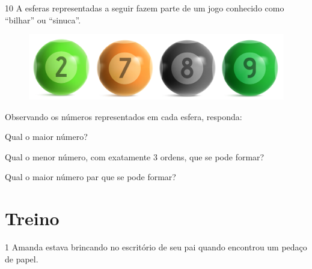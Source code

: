 
\num{10} A esferas representadas a seguir fazem parte de um jogo conhecido como
“bilhar” ou “sinuca”.

\begin{figure}[htpb!]
\includegraphics[width=\textwidth]{../ilustracoes/MAT5/SAEB_5ANO_MAT_figura11.png}
\end{figure}

Observando os números representados em cada esfera, responda:

\begin{escolha}
\item  Qual o maior número?\\

\item  Qual o menor número, com exatamente 3 ordens, que se pode formar?\\

\item  Qual o maior número par que se pode formar?\\

\end{escolha}

\section*{Treino}


\num{1} Amanda estava brincando no escritório de seu pai quando encontrou um pedaço de papel.

